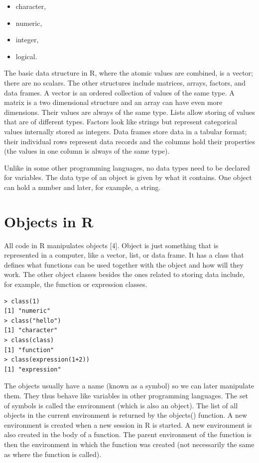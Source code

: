 \documentclass[11pt,openany,executivepaper]{book}
\begin{document}
\begin{itemize}
  \item character,
  \item numeric,
  \item integer,
  \item logical.
\end{itemize}

The basic data structure in R, where the atomic values are combined, is a vector; there are no scalars. The other structures include matrices, arrays, factors, and data frames. A vector is an ordered collection of values of the same type. A matrix is a two dimensional structure and an array can have even more dimensions. Their values are always of the same type. Lists allow storing of values that are of different types. Factors look like strings but represent categorical values internally stored as integers. Data frames store data in a tabular format; their individual rows represent data records and the columns hold their properties (the values in one column is always of the same type).

Unlike in some other programming languages, no data types need to be declared for variables. The data type of an object is given by what it contains. One object can hold a number and later, for example, a string.

\section{Objects in R}
All code in R manipulates objects [4]. Object is just something that is represented in a computer, like a vector, list, or data frame. It has a class that defines what functions can be used together with the object and how will they work. The other object classes besides the ones related to storing data include, for example, the function or expression classes.

\begin{verbatim}
> class(1)
[1] "numeric"
> class("hello")
[1] "character"
> class(class)
[1] "function"
> class(expression(1+2))
[1] "expression"
\end{verbatim}

The objects usually have a name (known as a symbol) so we can later manipulate them. They thus behave like variables in other programming languages. The set of symbols is called the environment (which is also an object). The list of all objects in the current environment is returned by the objects() function. A new environment is created when a new session in R is started. A new environment is also created in the body of a function. The parent environment of the function is then the environment in which the function was created (not necessarily the same as where the function is called).
\end{document}
